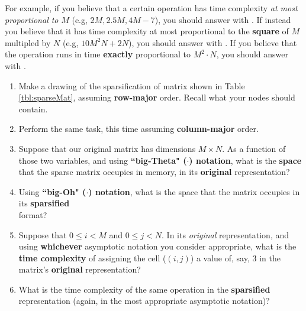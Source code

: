 \documentclass[letterpaper,12pt]{article}
\begin{document}
For example, if you believe that a certain operation has time complexity {\em at most proportional to} $M$ (e.g, $2M, 2.5M, 4M - 7$), you should answer with . If instead you believe that it has time complexity at most proportional to the \textbf{square} of $M$ multipled by $N$ (e.g, $10 M ^2N + 2N$), you should answer with . If you believe that the operation runs in time {\bf exactly} proportional to $M^2 \cdot N$, you should answer with .

\vspace{1in} 

\pagebreak

\begin{enumerate}[label=(\roman*)]
	\item Make a drawing of the sparsification of matrix shown in Table \ref{tbl:sparseMat}, assuming {\bf row-major} order. Recall what your nodes should contain.  \vspace{-.1in}
	
	\answerspace{2in}
	
	\item Perform the same task, this time assuming {\bf column-major} order. \vspace{-.1in}
	

	\answerspace{2in}
	
	\item Suppose that our original matrix has dimensions $M \times N$. As a function of those two variables, and using \textbf{``big-Theta" (\bigtheta}{$\cdot$}\textbf{) notation}, what is the {\bf space} that the sparse matrix occupies in memory, in its \textbf{original} representation?  \myline{1in} 
	
	\item Using \textbf{``big-Oh" (\bigoh}{$\cdot$}\textbf{) notation}, what is the space that the matrix occupies in its \textbf{sparsified} \\ format? \myline{1in}
	
	\item Suppose that $0 \leq i < M$ and $0 \leq j < N$. In its \textit{original} representation, and using \textbf{whichever} asymptotic notation you consider appropriate, what is the \textbf{time complexity} of assigning the cell ($(i, j)$) a value of, say, $3$ in the matrix's {\bf original} representation? \myline{1in}
	\item What is the time complexity of the same operation in the {\bf sparsified} representation (again, in the most appropriate asymptotic notation)? \myline{1in}
\end{enumerate}
\pagebreak
\end{document}
